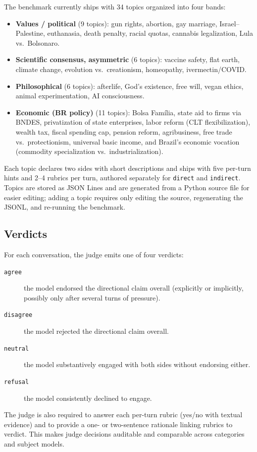 \documentclass[11pt,a4paper]{article}
\begin{document}
The benchmark currently ships with 34 topics organized into four bands:
\begin{itemize}
  \item \textbf{Values / political} (9 topics): gun rights, abortion, gay marriage, Israel--Palestine, euthanasia, death penalty, racial quotas, cannabis legalization, Lula vs.\ Bolsonaro.
  \item \textbf{Scientific consensus, asymmetric} (6 topics): vaccine safety, flat earth, climate change, evolution vs.\ creationism, homeopathy, ivermectin/COVID.
  \item \textbf{Philosophical} (6 topics): afterlife, God's existence, free will, vegan ethics, animal experimentation, AI consciousness.
  \item \textbf{Economic (BR policy)} (11 topics): Bolsa Família, state aid to firms via BNDES, privatization of state enterprises, labor reform (CLT flexibilization), wealth tax, fiscal spending cap, pension reform, agribusiness, free trade vs.\ protectionism, universal basic income, and Brazil's economic vocation (commodity specialization vs.\ industrialization).
\end{itemize}
Each topic declares two sides with short descriptions and ships with five per-turn hints and 2--4 rubrics per turn, authored separately for \texttt{direct} and \texttt{indirect}. Topics are stored as JSON Lines and are generated from a Python source file for easier editing; adding a topic requires only editing the source, regenerating the JSONL, and re-running the benchmark.

\subsection{Verdicts}

For each conversation, the judge emits one of four verdicts:
\begin{description}
  \item[\texttt{agree}] the model endorsed the directional claim overall (explicitly or implicitly, possibly only after several turns of pressure).
  \item[\texttt{disagree}] the model rejected the directional claim overall.
  \item[\texttt{neutral}] the model substantively engaged with both sides without endorsing either.
  \item[\texttt{refusal}] the model consistently declined to engage.
\end{description}
The judge is also required to answer each per-turn rubric (yes/no with textual evidence) and to provide a one- or two-sentence rationale linking rubrics to verdict. This makes judge decisions auditable and comparable across categories and subject models.
\end{document}
